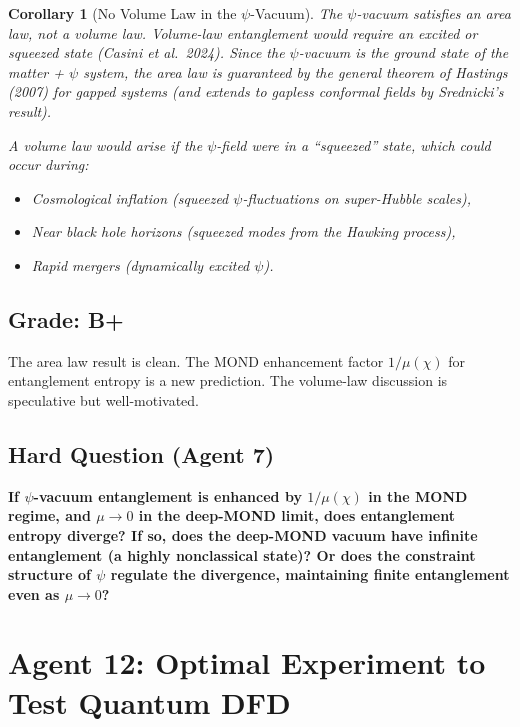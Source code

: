 \documentclass[11pt,a4paper]{article}
\newtheorem{corollary}{Corollary}
\begin{document}
\begin{corollary}[No Volume Law in the $\psi$-Vacuum]
The $\psi$-vacuum satisfies an area law, not a volume law. Volume-law entanglement would require an excited or squeezed state (Casini et al.\ 2024). Since the $\psi$-vacuum is the ground state of the matter + $\psi$ system, the area law is guaranteed by the general theorem of Hastings (2007) for gapped systems (and extends to gapless conformal fields by Srednicki's result).

A volume law would arise if the $\psi$-field were in a ``squeezed'' state, which could occur during:
\begin{itemize}
\item Cosmological inflation (squeezed $\psi$-fluctuations on super-Hubble scales),
\item Near black hole horizons (squeezed modes from the Hawking process),
\item Rapid mergers (dynamically excited $\psi$).
\end{itemize}
\end{corollary}

\subsection{Grade: B+}

The area law result is clean. The MOND enhancement factor $1/\mu(\chi)$ for entanglement entropy is a new prediction. The volume-law discussion is speculative but well-motivated.

\subsection{Hard Question (Agent 7)}

\textbf{If $\psi$-vacuum entanglement is enhanced by $1/\mu(\chi)$ in the MOND regime, and $\mu \to 0$ in the deep-MOND limit, does entanglement entropy diverge? If so, does the deep-MOND vacuum have infinite entanglement (a highly nonclassical state)? Or does the constraint structure of $\psi$ regulate the divergence, maintaining finite entanglement even as $\mu \to 0$?}

\newpage

\section{Agent 12: Optimal Experiment to Test Quantum DFD}
\label{sec:agent12}
\end{document}
